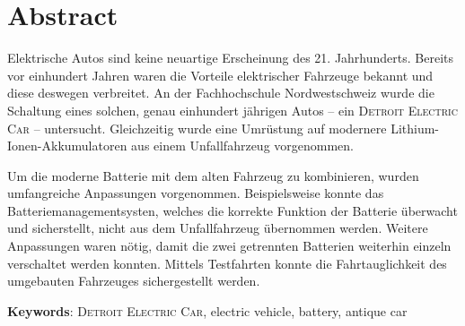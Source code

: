 \chapter*{Abstract}
Elektrische Autos sind keine neuartige Erscheinung des 21. Jahrhunderts. Bereits vor einhundert Jahren waren die Vorteile elektrischer Fahrzeuge bekannt und diese deswegen verbreitet. An der Fachhochschule Nordwestschweiz wurde die Schaltung eines solchen, genau einhundert jährigen Autos -- ein \textsc{Detroit Electric Car} -- untersucht. Gleichzeitig wurde eine Umrüstung auf modernere Lithium-Ionen-Akkumulatoren aus einem Unfallfahrzeug vorgenommen.

Um die moderne Batterie mit dem alten Fahrzeug zu kombinieren, wurden umfangreiche Anpassungen vorgenommen. Beispielsweise konnte das Batteriemanagementsysten, welches die korrekte Funktion der Batterie überwacht und sicherstellt, nicht aus dem Unfallfahrzeug übernommen werden. Weitere Anpassungen waren nötig, damit die zwei getrennten Batterien weiterhin einzeln verschaltet werden konnten. Mittels Testfahrten konnte die Fahrtauglichkeit des umgebauten Fahrzeuges sichergestellt werden.

\textbf{Keywords}: \textsc{Detroit Electric Car}, electric vehicle, battery, antique car
